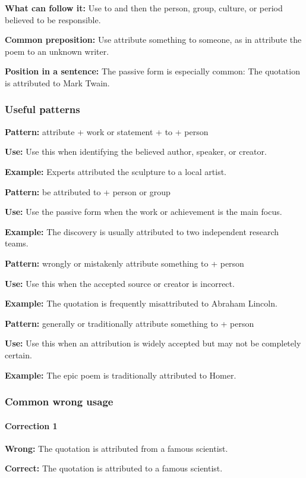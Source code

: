 \documentclass[11pt]{article}
\begin{document}
\textbf{What can follow it:} Use to and then the person, group, culture, or period believed to be responsible.

\textbf{Common preposition:} Use attribute something to someone, as in attribute the poem to an unknown writer.

\textbf{Position in a sentence:} The passive form is especially common: The quotation is attributed to Mark Twain.

\subsubsection{Useful patterns}
\textbf{Pattern:} attribute + work or statement + to + person

\textbf{Use:} Use this when identifying the believed author, speaker, or creator.

\textbf{Example:} Experts attributed the sculpture to a local artist.

\textbf{Pattern:} be attributed to + person or group

\textbf{Use:} Use the passive form when the work or achievement is the main focus.

\textbf{Example:} The discovery is usually attributed to two independent research teams.

\textbf{Pattern:} wrongly or mistakenly attribute something to + person

\textbf{Use:} Use this when the accepted source or creator is incorrect.

\textbf{Example:} The quotation is frequently misattributed to Abraham Lincoln.

\textbf{Pattern:} generally or traditionally attribute something to + person

\textbf{Use:} Use this when an attribution is widely accepted but may not be completely certain.

\textbf{Example:} The epic poem is traditionally attributed to Homer.

\subsubsection{Common wrong usage}
\paragraph{Correction 1}
\textbf{Wrong:} The quotation is attributed from a famous scientist.

\textbf{Correct:} The quotation is attributed to a famous scientist.
\end{document}
